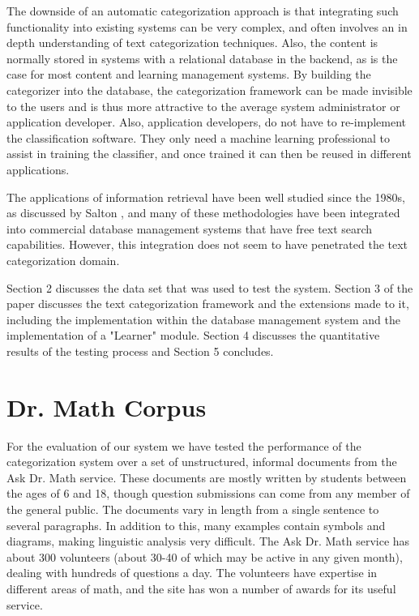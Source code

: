 \documentclass[twocolumn]{article}
\begin{document}
The downside of an automatic categorization approach is that integrating such 
functionality into existing systems can be very complex, and often involves an in 
depth understanding of text categorization techniques.  Also, the content is normally 
stored in systems with a relational database in the backend, as is the case for most 
content and learning management systems. By building the categorizer into the 
database, the categorization framework\cite{williams:02} can be made invisible to the 
users and is thus more attractive to the average system administrator or application 
developer. Also, application developers, do not have to re-implement the 
classification software. They only need a machine learning professional to assist in 
training the classifier, and once trained it can then be reused in different applications. 

The applications of information retrieval have been well studied since the 1980s, as 
discussed by Salton \cite{salton:89,salton:91}, and many of these methodologies have been 
integrated into commercial database management systems that have free text search 
capabilities. However, this integration does not seem to have penetrated the text 
categorization domain.

Section 2 discusses the data set that was used to test the system. Section 3 of the 
paper discusses the text categorization framework and the extensions made to it, 
including the implementation within the database management system and the 
implementation of a "Learner" module. Section 4 discusses the quantitative results of 
the testing process and Section 5 concludes.

\section{Dr. Math Corpus}

For the evaluation of our system we have tested the performance of the
categorization system over a set of unstructured, informal documents
from the Ask Dr. Math service.\cite{drmath} These documents are mostly
written by students between the ages of 6 and 18, though question
submissions can come from any member of the general public.  The documents vary
in length from a single sentence to several paragraphs. In addition to
this, many examples contain symbols and diagrams, making linguistic
analysis very difficult. The Ask Dr. Math service has about 300
volunteers (about 30-40 of which may be active in any given month),
dealing with hundreds of questions a day. The volunteers have
expertise in different areas of math, and the site has won a number of
awards for its useful service.
\end{document}
